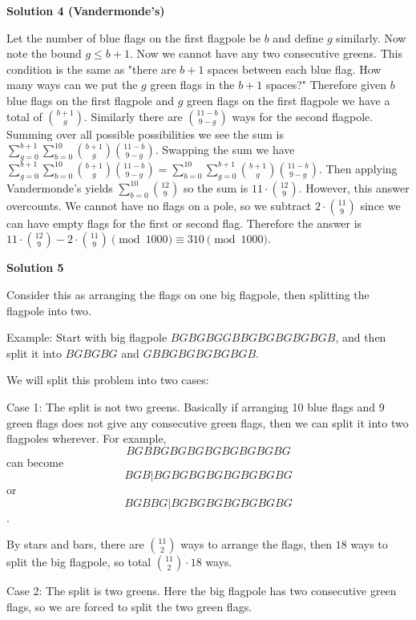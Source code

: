 \begin{enumerate}
 


 


 



\textbf{Solution 4 (Vandermonde's)}

Let the number of blue flags on the first flagpole be $b$ and define $g$ similarly. Now note the bound $g \le b+1.$ Now we cannot have any two consecutive greens. This condition is the same as "there are $b+1$ spaces between each blue flag. How many ways can we put the $g$ green flags in the $b+1$ spaces?" Therefore given $b$ blue flags on the first flagpole and $g$ green flags on the first flagpole we have a total of $\binom{b+1}{g}.$ Similarly there are $\binom{11-b}{9-g}$ ways for the second flagpole. Summing over all possible possibilities we see the sum is $\sum_{g = 0}^{b+1} \sum_{b=0}^{10}\binom{b+1}{g}\binom{11-b}{9-g}.$ Swapping the sum we have $\sum_{g = 0}^{b+1} \sum_{b=0}^{10}\binom{b+1}{g}\binom{11-b}{9-g} = \sum_{b=0}^{10} \sum_{g = 0}^{b+1}\binom{b+1}{g}\binom{11-b}{9-g}.$ Then applying Vandermonde's yields $\sum_{b=0}^{10}\binom{12}{9}$ so the sum is $11 \cdot\binom{12}{9}.$ However, this answer overcounts. We cannot have no flags on a pole, so we subtract $2 \cdot\binom{11}{9}$ since we can have empty flags for the first or second flag. Therefore the answer is $11 \cdot\binom{12}{9} - 2 \cdot\binom{11}{9} \pmod{1000} \equiv \boxed{310} \pmod{1000}.$




\textbf{Solution 5}

Consider this as arranging the flags on one big flagpole, then splitting the flagpole into two. 

 Example: Start with big flagpole $BGBGBGGBBGBGBGBGBGB$, and then split it into $BGBGBG$ and $GBBGBGBGBGBGB$.

 We will split this problem into two cases:

 Case 1: The split is not two greens. Basically if arranging 10 blue flags and 9 green flags does not give any consecutive green flags, then we can split it into two flagpoles wherever. For example,
 \[BGBBGBGBGBGBGBGBGBG\]can become 
 \[BGB|BGBGBGBGBGBGBGBG\] or 
 \[BGBBG|BGBGBGBGBGBGBG\].

 By stars and bars, there are $\binom{11}{2}$ ways to arrange the flags, then $18$ ways to split the big flagpole, so total $\binom{11}{2}\cdot 18$ ways.

 Case 2: The split is two greens. Here the big flagpole has two consecutive green flags, so we are forced to split the two green flags.


\end{enumerate}

